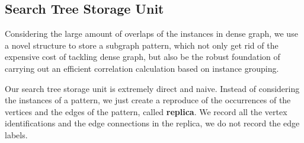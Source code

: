 \subsection{Search Tree Storage Unit}\label{subsec:unit}
Considering the large amount of overlaps of the instances in dense graph, we use a novel structure to store a subgraph pattern, which not only get rid of the expensive cost of tackling dense graph, but also be the robust foundation of carrying out an efficient correlation calculation based on instance grouping.
\par Our search tree storage unit is extremely direct and naive. Instead of considering the instances of a pattern, we just create a reproduce of the occurrences of the vertices and the edges of the pattern, called {\bf replica}. We record all the vertex identifications and the edge connections in the replica, we do not record the edge labels.
